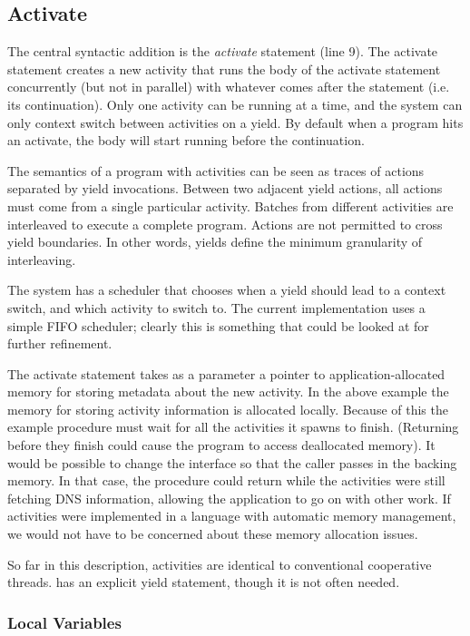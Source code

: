 \documentclass[pldi,10pt,preprint]{sigplanconf-pldi16}
\begin{document}
\subsection{Activate}

The central syntactic addition is the \emph{activate} statement (line 9).
The activate statement creates a new activity that runs the body of the activate statement concurrently (but not in parallel) with whatever comes after the statement (i.e. its continuation).
Only one activity can be running at a time, and the system can only context switch between activities on a yield.
By default when a program hits an activate, the body will start running before the continuation.

The semantics of a program with activities can be seen as traces of actions separated by yield invocations.
Between two adjacent yield actions, all actions must come from a single particular activity.
Batches from different activities are interleaved to execute a complete program.
Actions are not permitted to cross yield boundaries.
In other words, yields define the minimum granularity of interleaving.

The system has a scheduler that chooses when a yield should lead to a context switch, and which activity to switch to.
The current \charcoal{} implementation uses a simple FIFO scheduler; clearly this is something that could be looked at for further refinement.

The activate statement takes as a parameter a pointer to application-allocated memory for storing metadata about the new activity.
In the above example the memory for storing activity information is allocated locally.
Because of this the example procedure must wait for all the activities it spawns to finish.
(Returning before they finish could cause the program to access deallocated memory).
It would be possible to change the interface so that the caller passes in the backing memory.
In that case, the procedure could return while the activities were still fetching DNS information, allowing the application to go on with other work.
If activities were implemented in a language with automatic memory management, we would not have to be concerned about these memory allocation issues.

So far in this description, activities are identical to conventional cooperative threads.
\charcoal{} has an explicit yield statement, though it is not often needed.

\subsubsection{Local Variables}
\end{document}
